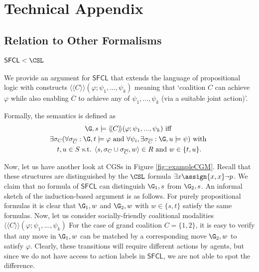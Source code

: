 \clearpage
\appendix
\section*{Technical Appendix}

\subsection*{Relation to Other Formalisms}
\paragraph*{$\mathsf{SFCL} < \CSL$}

We provide an argument for $\mathsf{SFCL}$ that extends the language of propositional logic with constructs $\langle \! \langle  C \rangle \! \rangle (\varphi;\psi_1,...,\psi_k)$ meaning that `coalition $C$ can achieve $\varphi$ while also enabling $\overline{C}$ to achieve any of $\psi_1,...,\psi_k$ (via a suitable joint action)'. 

Formally, the semantics is defined as 
\begin{gather*}
    \G,s \models \langle \! \langle C \rangle \! \rangle (\varphi; \psi_1, ..., \psi_k) \text{ iff }\\
    \exists \sigma_C (\forall \sigma_{\overline{C}} : \G,t \models \varphi \text{ and } \forall \psi_i, \exists  \sigma_{\overline{C}}:\G,u \models \psi) \text{ with } \\ t,u \in S \text{ s.t. } \langle s, \sigma_C \cup \sigma_{\overline{C}}, w \rangle \in R
\text{ and } w \in \{t,u\}.
\end{gather*}
\iffalse
  \begin{alignat*}{3}
        &\G,s \models \langle \! \langle C \rangle \! \rangle (\varphi; \psi_1, ..., \psi_k) && \text{ iff } && \exists \sigma_C (\forall \sigma_{\overline{C}} : \G,t \models \varphi \text{ and }\\ 
       & && && \forall \psi_i, \exists  \sigma_{\overline{C}}:\G_u \models \psi) \text{ with } \\
         & && &&  t,u \in S \text{ s.t. } \langle s, \sigma_C \cup \sigma_{\overline{C}}, w \rangle \in R\\
        & && && \text{ and } w \in \{t,u\}.   
\end{alignat*}   
\fi

Now, let us have another look at CGSs in Figure \ref{fig::exampleCGM}. Recall that these structures are distinguished by the $\CSL$ formula $\exists x \assign{x,x} \lnot p$. We claim that no formula of $\mathsf{SFCL}$ can distinguish $\G_1,s$ from $\G_2,s$. An informal sketch of the induction-based argument is as follows. For purely propositional formulas it is clear that $\G_1,w$ and $\G_2,w$ with $w\in \{s,t\}$ satisfy the same formulas. Now, let us consider socially-friendly coalitional modalities $\langle \! \langle  C \rangle \! \rangle (\varphi;\psi_1,...,\psi_k)$ For the case of grand coalition $C = \{1,2\}$, it is easy to verify that any move in $\G_1,w$ can be matched by a corresponding move $\G_2,w$ to satisfy $\varphi$. Clearly, these transitions will require different actions by agents, but since we do not have access to action labels in $\mathsf{SFCL}$, we are not able to spot the difference. 

